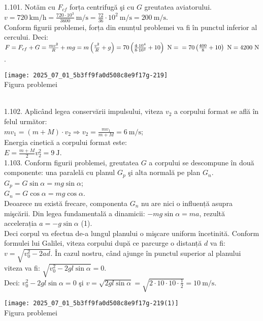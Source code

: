 1.101. Notăm cu $F_{c f}$ forța centrifugă şi cu $G$ greutatea aviatorului.\\ $v=720 \mathrm{~km} / \mathrm{h}=\frac{720 \cdot 10^{3}}{3600} \mathrm{~m} / \mathrm{s}=\frac{72}{36} \cdot 10^{2} \mathrm{~m} / \mathrm{s}=200 \mathrm{~m} / \mathrm{s}$.\\ Conform figurii problemei, forța din enunțul problemei va fi în punctul inferior al cercului. Deci:\\ $F=F_{c f}+G=\frac{m v^{2}}{R}+m g=m\left(\frac{v^{2}}{R}+g\right)=70\left(\frac{4 \cdot 10^{4}}{8 \cdot 10^{2}}+10\right) \mathrm{~N}=\\ =70\left(\frac{400}{8}+10\right) \mathrm{~N}=4200 \mathrm{~N}$.\\ \begin{center} \texttt{[image: 2025\_07\_01\_5b3ff9fa0d508c8e9f17g-219]}\\ Figura problemei \end{center}\\

1.102. Aplicând legea conservării impulsului, viteza $v_{2}$ a corpului format se află în felul următor:\\ $m v_{1}=(m+M) \cdot v_{2} \Rightarrow v_{2}=\frac{m v_{1}}{m+M}=6 \mathrm{~m} / \mathrm{s}$;\\ Energia cinetică a corpului format este:\\ $E=\frac{m+M}{2} v_{2}^{2}=9 \mathrm{~J}$.\\

1.103. Conform figurii problemei, greutatea $G$ a corpului se descompune în două componente: una paralelă cu planul $G_{p}$ şi alta normală pe plan $G_{n}$.\\ $G_{p}=G \sin \alpha=m g \sin \alpha$;\\ $G_{n}=G \cos \alpha=m g \cos \alpha$.\\ Deoarece nu există frecare, componenta $G_{n}$ nu are nici o influență asupra mişcării. Din legea fundamentală a dinamicii: $-m g \sin \alpha=m a$, rezultă accelerația $a=-g \sin \alpha$ (1).\\ Deci corpul va efectua de-a lungul planului o mişcare uniform încetinită. Conform formulei lui Galilei, viteza corpului după ce parcurge o distanță $d$ va fi: $v=\sqrt{v_{0}^{2}-2 a d}$. În cazul nostru, când ajunge în punctul superior al planului viteza va fi: $\sqrt{v_{0}^{2}-2 g l \sin \alpha}=0$.\\ Deci: $v_{0}^{2}-2 g l \sin \alpha=0$ şi $v=\sqrt{2 g l \sin \alpha}=\sqrt{2 \cdot 10 \cdot 10 \cdot \frac{1}{2}}=10 \mathrm{~m} / \mathrm{s}$.\\ \begin{center} \texttt{[image: 2025\_07\_01\_5b3ff9fa0d508c8e9f17g-219(1)]}\\ Figura problemei \end{center}\\ 

